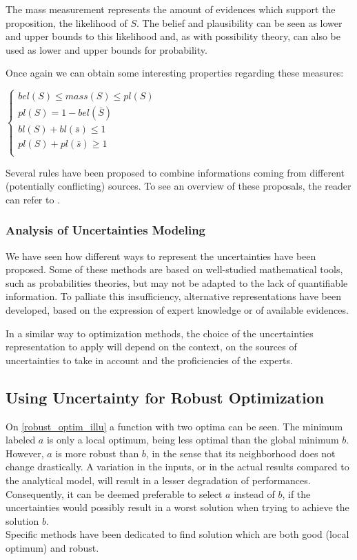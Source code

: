 The mass measurement represents the amount of evidences which support the proposition, the likelihood of $S$. The belief and plausibility can be seen as lower and upper bounds to this likelihood and, as with possibility theory, can also be used as lower and upper bounds for probability.

Once again we can obtain some interesting properties regarding these measures:

$\left\{
\begin{array}{l}
bel(S) \leq mass(S) \leq pl(S)\\
pl(S) = 1 - bel(\bar{S})\\
bl(S) + bl(\bar{s}) \leq 1\\
pl(S) + pl(\bar{s}) \geq 1\\
\end{array}
\right.$


Several rules have been proposed to combine informations coming from different (potentially conflicting) sources. To see an overview of these proposals, the reader can refer to \cite{sentz2002combination}.

\subsubsection{Analysis of Uncertainties Modeling}

We have seen how different ways to represent the uncertainties have been proposed. Some of these methods are based on well-studied mathematical tools, such as probabilities theories, but may not be adapted to the lack of quantifiable information. To palliate this insufficiency, alternative representations have been developed, based on the expression of expert knowledge or of available evidences.

In a similar way to optimization methods, the choice of the uncertainties representation to apply will depend on the context, on the sources of uncertainties to take in account and the proficiencies of the experts.

\subsection{Using Uncertainty for Robust Optimization}

On \figurename{} \ref{robust_optim_illu} a function with two optima can be seen. The minimum labeled $a$ is only a local optimum, being less optimal than the global minimum $b$. However, $a$ is more robust than $b$, in the sense that its neighborhood does not change drastically. A variation in the inputs, or in the actual results compared to the analytical model, will result in a lesser degradation of performances. Consequently, it can be deemed preferable to select $a$ instead of $b$, if the uncertainties would possibly result in a worst solution when trying to achieve the solution $b$.\\
Specific methods have been dedicated to find solution which are both good (local optimum) and robust.


